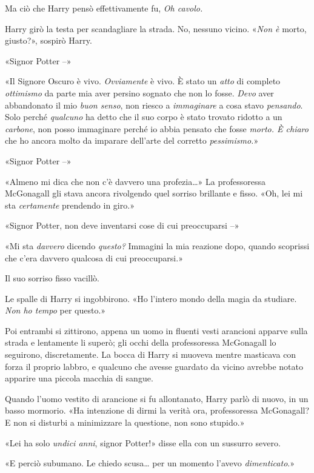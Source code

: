 Ma ciò che Harry pensò effettivamente fu, \textit{Oh cavolo.}

Harry girò la testa per scandagliare la strada. No, nessuno vicino. «\textit{Non è} morto, giusto?», sospirò Harry.

«Signor Potter –»

«Il Signore Oscuro è vivo. \textit{Ovviamente} è vivo. È stato un \textit{atto} di completo \textit{ottimismo} da parte mia aver persino sognato che non lo fosse. \textit{Devo} aver abbandonato il mio \textit{buon senso}, non riesco a \textit{immaginare} a cosa stavo \textit{pensando}. Solo perché \textit{qualcuno} ha detto che il suo corpo è stato trovato ridotto a un \textit{carbone}, non posso immaginare perché io abbia pensato che fosse \textit{morto. È chiaro} che ho ancora molto da imparare dell’arte del corretto \textit{pessimismo.}»

«Signor Potter –»

«Almeno mi dica che non c’è davvero una profezia…» La professoressa McGonagall gli stava ancora rivolgendo quel sorriso brillante e fisso. «Oh, lei mi sta \textit{certamente} prendendo in giro.»

«Signor Potter, non deve inventarsi cose di cui preoccuparsi –»

«Mi sta \textit{davvero} dicendo \textit{questo?} Immagini la mia reazione dopo, quando scoprissi che c’era davvero qualcosa di cui preoccuparsi.»

Il suo sorriso fisso vacillò.

Le spalle di Harry si ingobbirono. «Ho l’intero mondo della magia da studiare. \textit{Non ho tempo} per questo.»

Poi entrambi si zittirono, appena un uomo in fluenti vesti arancioni apparve sulla strada e lentamente li superò; gli occhi della professoressa McGonagall lo seguirono, discretamente. La bocca di Harry si muoveva mentre masticava con forza il proprio labbro, e qualcuno che avesse guardato da vicino avrebbe notato apparire una piccola macchia di sangue.

Quando l’uomo vestito di arancione si fu allontanato, Harry parlò di nuovo, in un basso mormorio. «Ha intenzione di dirmi la verità ora, professoressa McGonagall? E non si disturbi a minimizzare la questione, non sono stupido.»

«Lei ha solo \textit{undici anni}, signor Potter!» disse ella con un sussurro severo.

«E perciò subumano. Le chiedo scusa… per un momento l’avevo \textit{dimenticato}.»

